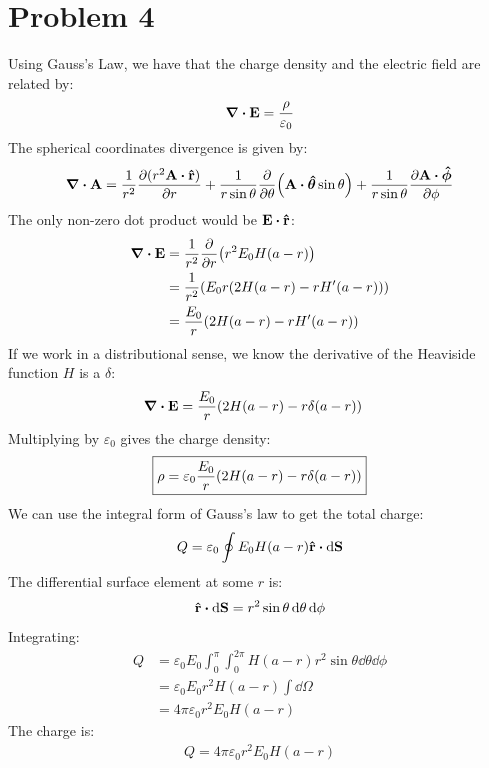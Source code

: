 \documentclass[12pt]{article}
\begin{document}
\section*{Problem 4}
Using Gauss's Law, we have that the charge density and the electric field are related by:
\begin{align*}
  \div{\vb{E}}=\frac{\rho}{\varepsilon_0}
\end{align*}
The spherical coordinates divergence is given by:
\begin{align*}
  \div{\vb{A}}=\frac{1}{r^2}\pdv{(r^2\vb{A}\vdot\vu{r})}{r}
  +\frac1{r\sin\theta}\pdv{\theta}(\vb{A}\vdot\bm{\hat\theta}\sin\theta)
  +\frac1{r\sin\theta}\pdv{\vb{A}\vdot\bm{\hat\phi}}{\phi}
\end{align*}
The only non-zero dot product would be $\vb{E}\vdot\vu{r}$:
\begin{align*}
  \div{\vb{E}}&=\frac1{r^2}\pdv{r}\qty(r^2E_0H(a-r))\\
  &=\frac1{r^2}\qty(E_0r\qty(2H(a-r)-rH'(a-r)))\\
  &=\frac{E_0}{r}\qty(2H(a-r)-rH'(a-r))
\end{align*}
If we work in a distributional sense, we know the derivative of the Heaviside function $H$ is a $\delta$:
\begin{align*}
  \div{\vb{E}}&=\frac{E_0}{r}\qty(2H(a-r)-r\delta(a-r))
\end{align*}
Multiplying by $\varepsilon_0$ gives the charge density:
\begin{align}
  \boxed{
    \rho=\varepsilon_0\frac{E_0}{r}\qty(2H(a-r)-r\delta(a-r))
  }
\end{align}
We can use the integral form of Gauss's law to get the total charge:
\begin{align*}
  Q=\varepsilon_0\oint E_0H(a-r)\vu{r}\vdot\dd{\vb{S}}
\end{align*}
The differential surface element at some $r$ is:
\begin{align*}
  \vu{r}\vdot\dd{\vb{S}}=r^2\sin\theta\dd{\theta}\dd{\phi}
\end{align*}
Integrating:
\begin{align*}
  Q&=\varepsilon_0E_0\int_0^\pi\int_0^{2\pi}H(a-r)
  r^2\sin\theta\dd{\theta}\dd{\phi}\\
  &=\varepsilon_0E_0r^2H(a-r)\int\dd{\Omega}\\
  &=4\pi\varepsilon_0r^2E_0H(a-r)
\end{align*}
The charge is:
\begin{align}
  \boxed{
    Q=4\pi\varepsilon_0r^2E_0H(a-r)
  }
\end{align}
\end{document}
